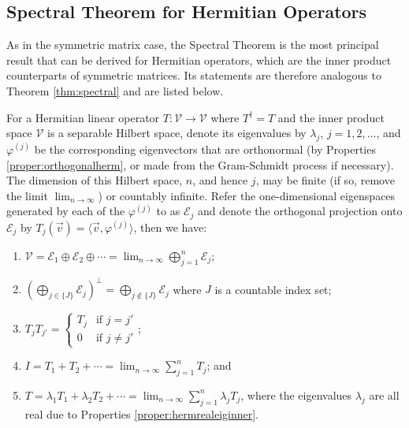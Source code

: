 \subsection{Spectral Theorem for Hermitian Operators}
\label{subsection:spectralthmherm}

As in the symmetric matrix case, the Spectral Theorem is the most principal result that can be derived for Hermitian operators, which are the inner product counterparts of symmetric matrices. Its statements are therefore analogous to Theorem \ref{thm:spectral} and are listed below.
\begin{thm}
\label{thm:spectralinner}
For a Hermitian linear operator $T: \mathcal{V} \to \mathcal{V}$ where $T^\dag = T$ and the inner product space $\mathcal{V}$ is a separable Hilbert space, denote its eigenvalues by $\lambda_j$, $j = 1,2,\ldots$, and $\varphi^{(j)}$ be the corresponding eigenvectors that are orthonormal (by Properties \ref{proper:orthogonalherm}, or made from the Gram-Schmidt process if necessary). The dimension of this Hilbert space, $n$, and hence $j$, may be finite (if so, remove the limit $\lim_{n \to \infty}$) or countably infinite. Refer the one-dimensional eigenspaces generated by each of the $\varphi^{(j)}$ to as $\mathcal{E}_{j}$ and denote the orthogonal projection onto $\mathcal{E}_{j}$ by $T_{j}(\vec{v}) = \langle \vec{v} , \varphi^{(j)} \rangle$, then we have:
\begin{enumerate}[label=(\alph*)]
\item $\mathcal{V} = \mathcal{E}_{1} \oplus \mathcal{E}_{2} \oplus \cdots = \lim_{n \to \infty} \bigoplus_{j=1}^{n} \mathcal{E}_{j}$;
\item $(\bigoplus_{j \in \{J\}} \mathcal{E}_{j})^\perp = \bigoplus_{j \notin \{J\}} \mathcal{E}_{j}$ where $J$ is a countable index set;
\item $T_{j} T_{j'} = 
\begin{cases}
T_{j} & \text{if $j = j'$} \\
0 & \text{if $j \neq j'$}
\end{cases}$;
\item $I = T_{1} + T_{2} + \cdots = \lim_{n \to \infty} \sum_{j=1}^{n} T_{j}$; and
\item $T = \lambda_{1}T_{1} + \lambda_{2}T_{2} + \cdots = \lim_{n \to \infty} \sum_{j=1}^{n} \lambda_{j}T_{j}$, where the eigenvalues $\lambda_j$ are all real due to Properties \ref{proper:hermrealeiginner}.
\end{enumerate}
\end{thm}
